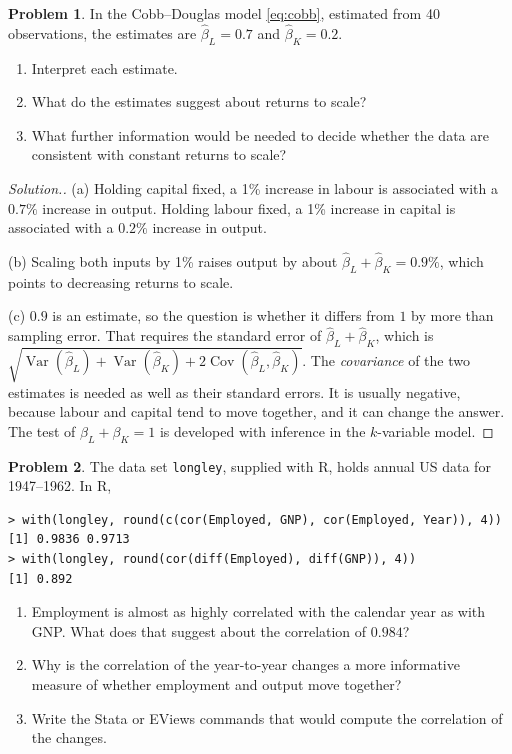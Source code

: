 \documentclass[11pt,a4paper]{article}
\numberwithin{equation}{section}
\DeclareMathOperator{\Var}{Var}
\DeclareMathOperator{\Cov}{Cov}
\theoremstyle{definition}
\newtheorem{problemx}{Problem}[subsection]
\newenvironment{problem}{\begin{problemx}}{\end{problemx}}
\newenvironment{solution}
  {\renewcommand{\qedsymbol}{}\begin{proof}[\textit{Solution}.]}
  {\end{proof}}
\begin{document}
\begin{problem}
In the Cobb--Douglas model \eqref{eq:cobb}, estimated from 40 observations, the estimates are $\hat\beta_L = 0.7$ and $\hat\beta_K = 0.2$.
\begin{enumerate}[label=(\alph*)]
\item Interpret each estimate.
\item What do the estimates suggest about returns to scale?
\item What further information would be needed to decide whether the data are consistent with constant returns to scale?
\end{enumerate}
\end{problem}

\begin{solution}
(a) Holding capital fixed, a 1\% increase in labour is associated with a $0.7\%$ increase in output. Holding labour fixed, a 1\% increase in
capital is associated with a $0.2\%$ increase in output.

(b) Scaling both inputs by 1\% raises output by about $\hat\beta_L + \hat\beta_K = 0.9\%$, which points to decreasing returns to scale.

(c) $0.9$ is an estimate, so the question is whether it differs from $1$ by more than sampling error. That requires the standard error of
$\hat\beta_L + \hat\beta_K$, which is
$\sqrt{\Var(\hat\beta_L) + \Var(\hat\beta_K) + 2\Cov(\hat\beta_L, \hat\beta_K)}$. The \emph{covariance} of the two estimates is needed as well as
their standard errors. It is usually negative, because labour and capital tend to move together, and it can change the answer. The test of
$\beta_L + \beta_K = 1$ is developed with inference in the $k$-variable model.
\end{solution}

\begin{problem}
\label{prob:longley}
The data set \texttt{longley}, supplied with R, holds annual US data for 1947--1962. In R,
{\small\begin{verbatim}
> with(longley, round(c(cor(Employed, GNP), cor(Employed, Year)), 4))
[1] 0.9836 0.9713
> with(longley, round(cor(diff(Employed), diff(GNP)), 4))
[1] 0.892
\end{verbatim}}
\begin{enumerate}[label=(\alph*)]
\item Employment is almost as highly correlated with the calendar year as with GNP. What does that suggest about the correlation of $0.984$?
\item Why is the correlation of the year-to-year changes a more informative measure of whether employment and output move together?
\item Write the Stata or EViews commands that would compute the correlation of the changes.
\end{enumerate}
\end{problem}
\end{document}
